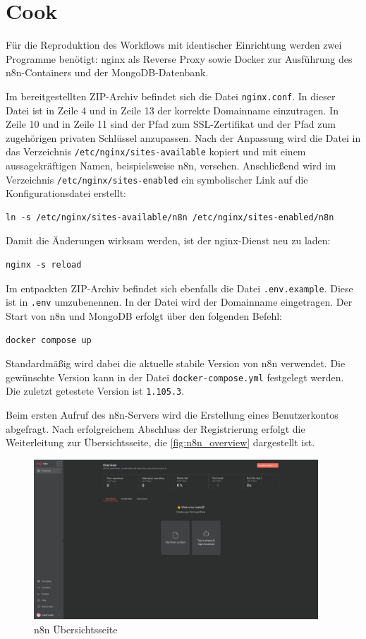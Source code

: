 \section{Cook}\label{sec:cook} %

Für die Reproduktion des Workflows mit identischer Einrichtung werden zwei Programme benötigt: nginx
als Reverse Proxy sowie Docker zur Ausführung des n8n-Containers und der MongoDB-Datenbank.


Im bereitgestellten ZIP-Archiv befindet sich die Datei \verb|nginx.conf|. In dieser Datei ist in Zeile 4
und in Zeile 13 der korrekte Domainname einzutragen. In Zeile 10 und in Zeile 11 sind der Pfad zum
SSL-Zertifikat und der Pfad zum zugehörigen privaten Schlüssel anzupassen. Nach der Anpassung wird
die Datei in das Verzeichnis \verb|/etc/nginx/sites-available| kopiert und mit einem aussagekräftigen
Namen, beispielsweise n8n, versehen. Anschließend wird im Verzeichnis
\verb|/etc/nginx/sites-enabled| ein
symbolischer Link auf die Konfigurationsdatei erstellt:

\begin{verbatim}
ln -s /etc/nginx/sites-available/n8n /etc/nginx/sites-enabled/n8n
\end{verbatim}

Damit die Änderungen wirksam werden, ist der nginx-Dienst neu zu laden:

\begin{verbatim}
nginx -s reload
\end{verbatim}

Im entpackten ZIP-Archiv befindet sich ebenfalls die Datei \verb|.env.example|. Diese ist in
\verb|.env| umzubenennen. In der Datei wird der Domainname eingetragen. Der Start von n8n und
MongoDB erfolgt über den folgenden Befehl:

\begin{verbatim}
docker compose up
\end{verbatim}

Standardmäßig wird dabei die aktuelle stabile Version von n8n verwendet. Die gewünschte Version kann
in der Datei \verb|docker-compose.yml| festgelegt werden. Die zuletzt getestete Version ist
\verb|1.105.3|.

Beim ersten Aufruf des n8n-Servers wird die Erstellung eines Benutzerkontos abgefragt. Nach
erfolgreichem Abschluss der Registrierung erfolgt die Weiterleitung zur Übersichtsseite, die
\autoref{fig:n8n_overview} dargestellt ist.

\begin{figure}
    \begin{center}
        \includegraphics[width=0.95\textwidth]{images/n8n_overview.png}
    \end{center}
    \caption{n8n Übersichtsseite}\label{fig:n8n_overview}
\end{figure}

